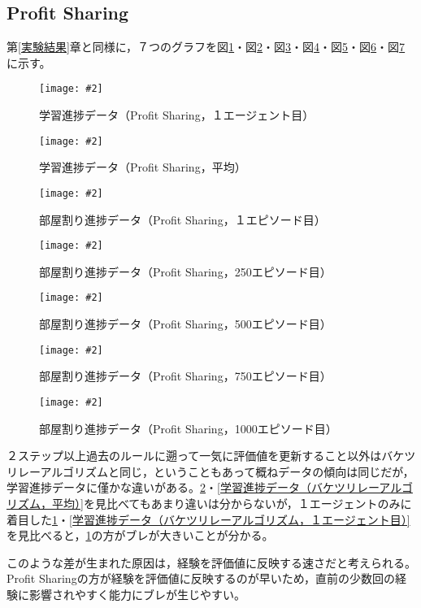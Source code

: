 \documentclass[titlepage]{ltjsreport}
\newcommand{\image}[2]{\begin{figure}[h]\vspace{1em}\begin{center}\texttt{[image: \#2]}\caption{#1}\label{#1}\end{center}\end{figure}}
\begin{document}
\subsection{Profit Sharing}
\label{Profit Sharingとの比較}
第\ref{実験結果}章と同様に，７つのグラフを図\ref{学習進捗データ（Profit Sharing，１エージェント目）}・図\ref{学習進捗データ（Profit Sharing，平均）}・図\ref{部屋割り進捗データ（Profit Sharing，１エピソード目）}・図\ref{部屋割り進捗データ（Profit Sharing，250エピソード目）}・図\ref{部屋割り進捗データ（Profit Sharing，500エピソード目）}・図\ref{部屋割り進捗データ（Profit Sharing，750エピソード目）}・図\ref{部屋割り進捗データ（Profit Sharing，1000エピソード目）}に示す。
\image{学習進捗データ（Profit Sharing，１エージェント目）}{外部ファイル/学習進捗データ/Profit-Sharing/１エージェント目.png}
\image{学習進捗データ（Profit Sharing，平均）}{外部ファイル/学習進捗データ/Profit-Sharing/平均.png}
\image{部屋割り進捗データ（Profit Sharing，１エピソード目）}{外部ファイル/部屋割り進捗データ/Profit-Sharing/１エピソード目}
\image{部屋割り進捗データ（Profit Sharing，250エピソード目）}{外部ファイル/部屋割り進捗データ/Profit-Sharing/250エピソード目}
\image{部屋割り進捗データ（Profit Sharing，500エピソード目）}{外部ファイル/部屋割り進捗データ/Profit-Sharing/500エピソード目}
\image{部屋割り進捗データ（Profit Sharing，750エピソード目）}{外部ファイル/部屋割り進捗データ/Profit-Sharing/750エピソード目}
\image{部屋割り進捗データ（Profit Sharing，1000エピソード目）}{外部ファイル/部屋割り進捗データ/Profit-Sharing/1000エピソード目}

２ステップ以上過去のルールに遡って一気に評価値を更新すること以外はバケツリレーアルゴリズムと同じ，ということもあって概ねデータの傾向は同じだが，学習進捗データに僅かな違いがある。\ref{学習進捗データ（Profit Sharing，平均）}・\ref{学習進捗データ（バケツリレーアルゴリズム，平均）}を見比べてもあまり違いは分からないが，１エージェントのみに着目した\ref{学習進捗データ（Profit Sharing，１エージェント目）}・\ref{学習進捗データ（バケツリレーアルゴリズム，１エージェント目）}を見比べると，\ref{学習進捗データ（Profit Sharing，１エージェント目）}の方がブレが大きいことが分かる。

このような差が生まれた原因は，経験を評価値に反映する速さだと考えられる。Profit Sharingの方が経験を評価値に反映するのが早いため，直前の少数回の経験に影響されやすく能力にブレが生じやすい。
\end{document}
